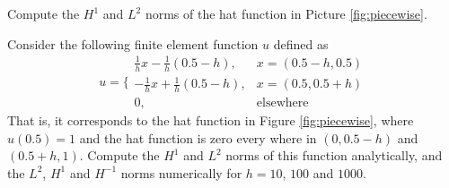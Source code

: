 \begin{exercise}
\label{ex:piecewise}
Compute the $H^1$ and $L^2$ norms of  the hat function in Picture \ref{fig:piecewise}.   
\end{exercise}



\begin{exercise}
\label{ex:hat2}
Consider the following finite element function $u$ defined
as  
\[
u = \Bigg\{ 
\begin{array}{ll} \frac{1}{h} x - \frac{1}{h} (0.5 - h), & x=(0.5-h,0.5) \\  
              -\frac{1}{h} x + \frac{1}{h} (0.5 - h),  & x=(0.5,0.5 + h) \\  
                0, & \mbox{elsewhere}  
\end{array}
\]
That is, it corresponds to the hat function in Figure \ref{fig:piecewise}, where
$u(0.5)=1$ and the hat function is zero every where in $(0,0.5-h)$ and  $(0.5+h, 1)$.  
Compute the $H^1$ and $L^2$ norms of this function analytically, and the 
$L^2$, $H^1$ and $H^{-1}$ norms numerically for $h=10$, $100$ and $1000$.    
\end{exercise}







